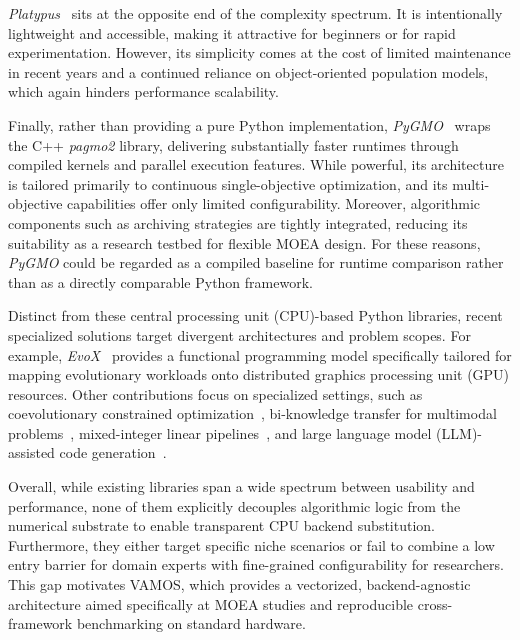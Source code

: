\documentclass[final,5p,times,twocolumn]{elsarticle}
\newcommand{\VAMOS}{VAMOS}
\begin{document}
\textit{Platypus}~\cite{hadka15} sits at the opposite end of the complexity spectrum. It is intentionally lightweight and accessible, making it attractive for beginners or for rapid experimentation. However, its simplicity comes at the cost of limited maintenance in recent years and a continued reliance on object-oriented population models, which again hinders performance scalability.

Finally, rather than providing a pure Python implementation, \textit{PyGMO}~\cite{BI20} wraps the C++ \textit{pagmo2} library, delivering substantially faster runtimes through compiled kernels and parallel execution features. While powerful, its architecture is tailored primarily to continuous single-objective optimization, and its multi-objective capabilities offer only limited configurability. Moreover, algorithmic components such as archiving strategies are tightly integrated, reducing its suitability as a research testbed for flexible MOEA design. For these reasons, \textit{PyGMO} could be regarded as a compiled baseline for runtime comparison rather than as a directly comparable Python framework.

Distinct from these central processing unit (CPU)-based Python libraries, recent specialized solutions target divergent architectures and problem scopes. For example, \textit{EvoX}~\cite{HCL+25} provides a functional programming model specifically tailored for mapping evolutionary workloads onto distributed graphics processing unit (GPU) resources. Other contributions focus on specialized settings, such as coevolutionary constrained optimization~\cite{TZX+21}, bi-knowledge transfer for multimodal problems~\cite{ZNL+26}, mixed-integer linear pipelines~\cite{YXC26}, and large language model (LLM)-assisted code generation~\cite{MGG+26}.

Overall, while existing libraries span a wide spectrum between usability and performance, none of them explicitly decouples algorithmic logic from the numerical substrate to enable transparent CPU backend substitution. Furthermore, they either target specific niche scenarios or fail to combine a low entry barrier for domain experts with fine-grained configurability for researchers. This gap motivates \VAMOS{}, which provides a vectorized, backend-agnostic architecture aimed specifically at MOEA studies and reproducible cross-framework benchmarking on standard hardware.
\end{document}
